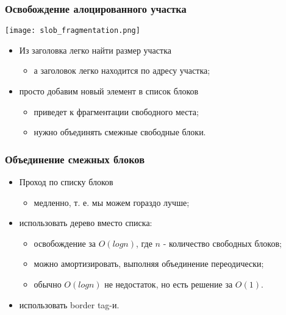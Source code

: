 \begin{frame}
\frametitle{Освобождение алоцированного участка}
\begin{center}
  \texttt{[image: slob\_fragmentation.png]}
\end{center}
\begin{itemize}
  \item Из заголовка легко найти размер участка
  \begin{itemize}
    \item а заголовок легко находится по адресу участка;
  \end{itemize}
  \item просто добавим новый элемент в список блоков
  \begin{itemize}
    \item приведет к фрагментации свободного места;
    \item нужно объединять смежные свободные блоки.
  \end{itemize}
\end{itemize}
\end{frame}

\begin{frame}
\frametitle{Объединение смежных блоков}
\begin{itemize}
  \item Проход по списку блоков
  \begin{itemize}
    \item медленно, т. е. мы можем гораздо лучше;
  \end{itemize}
  \item использовать дерево вместо списка:
  \begin{itemize}
    \item освобождение за $O(log n)$, где $n$ - количество свободных блоков;
    \item можно амортизировать, выполняя объединение переодически;
    \item обычно $O(log n)$ не недостаток, но есть решение за $O(1)$.
  \end{itemize}
  \item использовать border tag-и.
\end{itemize}
\end{frame}

